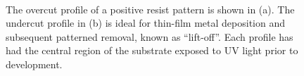 \documentclass[
  letterpaper,
  DIV=11,
  numbers=noendperiod]{scrartcl}
\begin{document}
\begin{figure}

\begin{minipage}[t]{0.47\linewidth}

{\centering 


}

\subcaption{\label{fig-overcut-profile}}
\end{minipage}%
%
\begin{minipage}[t]{0.05\linewidth}

{\centering 

~

}

\end{minipage}%
%
\begin{minipage}[t]{0.47\linewidth}

{\centering 


}

\subcaption{\label{fig-undercut-profile}}
\end{minipage}%

\caption{\label{fig-photolithography-profiles}The overcut profile of a
positive resist pattern is shown in (a). The undercut profile in (b) is
ideal for thin-film metal deposition and subsequent patterned removal,
known as ``lift-off''. Each profile has had the central region of the
substrate exposed to UV light prior to development.}

\end{figure}
\end{document}
